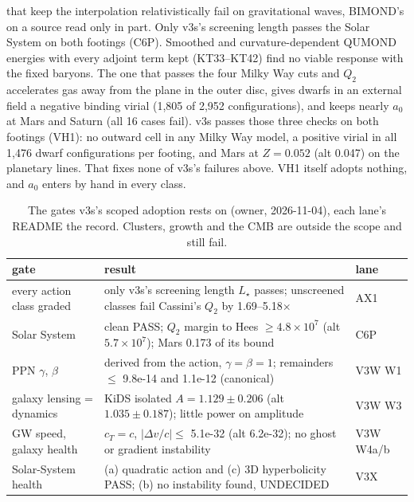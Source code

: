 \documentclass[10pt]{article}
\begin{document}
\begin{itemize}
that keep the interpolation relativistically fail on gravitational waves, BIMOND's on a source read only in part. Only v3s's screening length passes the Solar System on both footings (C6P). Smoothed and curvature-dependent QUMOND energies with every adjoint term kept (KT33--KT42) find no viable response with the fixed baryons. The one that passes the four Milky Way cuts and $Q_2$ accelerates gas away from the plane in the outer disc, gives dwarfs in an external field a negative binding virial (1,805 of 2,952 configurations), and keeps nearly $a_0$ at Mars and Saturn (all 16 cases fail). v3s passes those three checks on both footings (VH1): no outward cell in any Milky Way model, a positive virial in all 1,476 dwarf configurations per footing, and Mars at $Z=0.052$ (alt 0.047) on the planetary lines. That fixes none of v3s's failures above. VH1 itself adopts nothing, and $a_0$ enters by hand in every class.
\end{itemize}

\begin{table}[!htbp]\centering\small
\caption{The gates v3s's scoped adoption rests on (owner, 2026-11-04), each lane's README the record. Clusters, growth and the CMB are outside the scope and still fail.}\label{tab:v3s}
\begin{tabular}{>{\raggedright\arraybackslash}p{3.6cm}>{\raggedright\arraybackslash}p{9.4cm}l}
\toprule
gate & result & lane\\
\midrule
every action class graded & only v3s's screening length $L_\star$ passes; unscreened classes fail Cassini's $Q_2$ by 1.69--5.18$\times$ & AX1\\
Solar System & clean PASS; $Q_2$ margin to Hees $\ge4.8\times10^7$ (alt $5.7\times10^7$); Mars 0.173 of its bound & C6P\\
PPN $\gamma$, $\beta$ & derived from the action, $\gamma=\beta=1$; remainders $\le$ 9.8e-14 and 1.1e-12 (canonical) & V3W W1\\
galaxy lensing = dynamics & KiDS isolated $A=1.129\pm0.206$ (alt $1.035\pm0.187$); little power on amplitude & V3W W3\\
GW speed, galaxy health & $c_T=c$, $|\Delta v/c|\le$ 5.1e-32 (alt 6.2e-32); no ghost or gradient instability & V3W W4a/b\\
Solar-System health & (a) quadratic action and (c) 3D hyperbolicity PASS; (b) no instability found, UNDECIDED & V3X\\
\bottomrule
\end{tabular}
\end{table}
\end{document}
